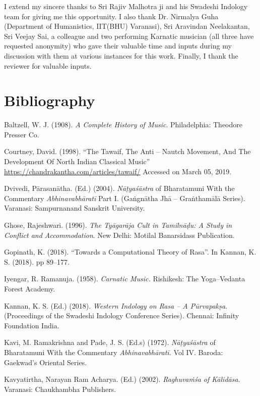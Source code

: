 I extend my sincere thanks to Sri Rajiv Malhotra ji and his Swadeshi Indology team for giving me this opportunity. I also thank Dr. Nirmalya Guha (Department of Humanistics, IIT(BHU) Varanasi), Sri Aravindan Neelakantan, Sri Veejay Sai, a colleague and two performing Karnatic musician (all three have requested anonymity) who gave their valuable time and inputs during my discussion with them at various instances for this work. Finally, I thank the reviewer for valuable inputs.


\section*{Bibliography}

\begin{thebibliography}{99}
\itemsep=0pt
 Baltzell, W. J. (1908). \textit{A Complete History of Music}. Philadelphia: Theodore Presser Co.

  Courtney, David. (1998). “The Tawaif, The Anti – Nautch Movement, And The Development Of North Indian Classical Music” \url{https://chandrakantha.com/articles/tawaif/} Accessed on March 05, 2019.

  Dvivedi, Pārasanātha. (Ed.) (2004). \textit{Nāṭyaśāstra} of Bharatamuni With the Commentary \textit{Abhinavabhāratī }Part I. (Gaṅgnātha Jhā – Graṅthamālā Series). Varanasi: Sampurnanand Sanskrit University.

  Ghose, Rajeshwari. (1996). \textit{The Tyāgarāja Cult in Tamilnāḍu: A Study in Conflict and Accommodation}. New Delhi: Motilal Banarsidass Publication.

  Gopinath, K. (2018). “Towards a Computational Theory of Rasa”. In Kannan, K. S. (2018). pp 89–177.

  Iyengar, R. Ramanuja. (1958). \textit{Carnatic Music.} Rishikesh: The Yoga–Vedanta Forest Academy.

  Kannan, K. S. (Ed.) (2018). \textit{Western Indology on Rasa – A Pūrvapakṣa}. (Proceedings of the Swadeshi Indology Conference Series). Chennai: Infinity Foundation India.

  Kavi, M. Ramakrishna and Pade, J. S. (Ed.s) (1972). \textit{Nāṭyaśāstra} of Bharatamuni With the Commentary \textit{Abhinavabhāratī. }Vol IV. Baroda: Gaekwad’s Oriental Series.

  Kavyatirtha, Narayan Ram Acharya. (Ed.) (2002). \textit{Raghuvaṁśa of Kālidāsa.} Varanasi: Chaukhambha Publishers.


\end{thebibliography}
